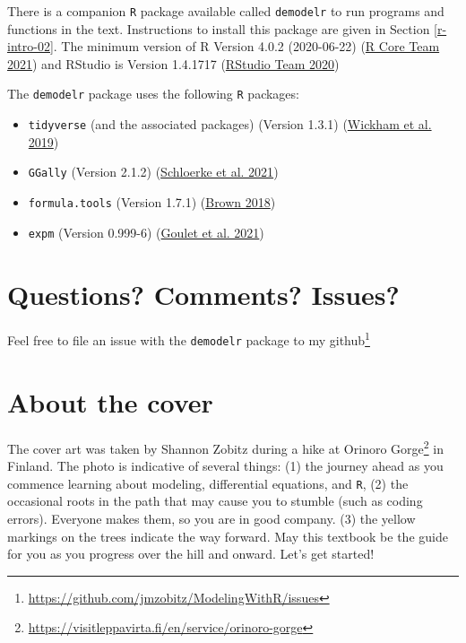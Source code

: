 \documentclass[
]{krantz}
\providecommand{\tightlist}{%
  \setlength{\itemsep}{0pt}\setlength{\parskip}{0pt}}
\renewcommand{\href}[2]{#2\footnote{\url{#1}}}
\theoremstyle{definition}
\theoremstyle{definition}
\theoremstyle{definition}
\theoremstyle{definition}
\theoremstyle{remark}
\begin{document}
There is a companion \texttt{R} package available called \texttt{demodelr} to run programs and functions in the text. Instructions to install this package are given in Section \ref{r-intro-02}. The minimum version of R Version 4.0.2 (2020-06-22) (\protect\hyperlink{ref-R-base}{R Core Team 2021}) and RStudio is Version 1.4.1717 (\protect\hyperlink{ref-rstudio_team_rstudio_2020}{RStudio Team 2020})

The \texttt{demodelr} package uses the following \texttt{R} packages:

\begin{itemize}
\tightlist
\item
  \texttt{tidyverse} (and the associated packages) (Version 1.3.1) (\protect\hyperlink{ref-tidyverse2019}{Wickham et al. 2019})
\item
  \texttt{GGally} (Version 2.1.2) (\protect\hyperlink{ref-R-GGally}{Schloerke et al. 2021})
\item
  \texttt{formula.tools} (Version 1.7.1) (\protect\hyperlink{ref-R-formula.tools}{Brown 2018})
\item
  \texttt{expm} (Version 0.999-6) (\protect\hyperlink{ref-R-expm}{Goulet et al. 2021})
\end{itemize}

\hypertarget{questions-comments-issues}{%
\section*{Questions? Comments? Issues?}\label{questions-comments-issues}}


Feel free to file an issue with the \texttt{demodelr} package to my \href{https://github.com/jmzobitz/ModelingWithR/issues}{github}

\hypertarget{about-the-cover}{%
\section*{About the cover}\label{about-the-cover}}


The cover art was taken by Shannon Zobitz during a hike at \href{https://visitleppavirta.fi/en/service/orinoro-gorge}{Orinoro Gorge} in Finland. The photo is indicative of several things: (1) the journey ahead as you commence learning about modeling, differential equations, and \texttt{R}, (2) the occasional roots in the path that may cause you to stumble (such as coding errors). Everyone makes them, so you are in good company. (3) the yellow markings on the trees indicate the way forward. May this textbook be the guide for you as you progress over the hill and onward. Let's get started!
\end{document}
